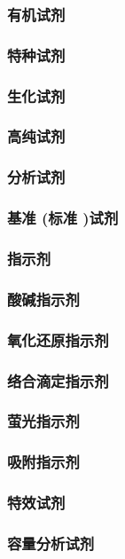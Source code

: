 \documentclass[UTF8]{../../ApplicationUniverse}
\begin{document}
        \subsubsection{有机试剂}
    \subsubsection{特种试剂}
        \subsubsection{生化试剂}
        \subsubsection{高纯试剂}
    \subsubsection{分析试剂}
        \subsubsection{基准 (标准 )试剂}
        \subsubsection{指示剂}
            \subsubsection{酸碱指示剂}
            \subsubsection{氧化还原指示剂}
            \subsubsection{络合滴定指示剂}
            \subsubsection{萤光指示剂}
            \subsubsection{吸附指示剂}
        \subsubsection{特效试剂}
        \subsubsection{容量分析试剂}
\end{document}
